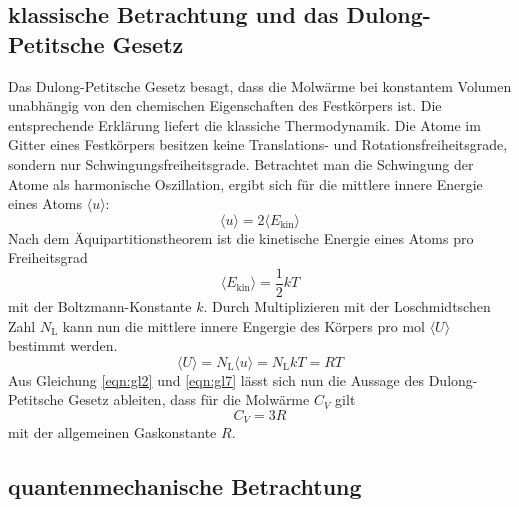 \subsection{klassische Betrachtung und das Dulong-Petitsche Gesetz}
\label{sec:klassisch}

Das Dulong-Petitsche Gesetz besagt, dass die Molwärme bei konstantem Volumen unabhängig von den chemischen Eigenschaften des Festkörpers ist.
Die entsprechende Erklärung liefert die klassiche Thermodynamik.
Die Atome im Gitter eines Festkörpers besitzen keine Translations- und Rotationsfreiheitsgrade, sondern nur Schwingungsfreiheitsgrade.
Betrachtet man die Schwingung der Atome als harmonische Oszillation, ergibt sich für die mittlere innere Energie eines Atoms $\langle u \rangle$:
\begin{equation}
  \langle u \rangle = 2 \langle E_\text{kin} \rangle
  \label{eqn:gl5}
\end{equation}
Nach dem Äquipartitionstheorem ist die kinetische Energie eines Atoms pro Freiheitsgrad
\begin{equation}
  \langle E_\text{kin} \rangle = \frac{1}{2} k T
  \label{eqn:gl6}
\end{equation}
mit der Boltzmann-Konstante $k$.
Durch Multiplizieren mit der Loschmidtschen Zahl $N_\text{L}$ kann nun die mittlere innere Engergie des Körpers pro \si{\mol} $\langle U \rangle$ bestimmt werden.
\begin{equation}
  \langle U \rangle = N_\text{L} \langle u \rangle = N_\text{L} k T = R T
  \label{eqn:gl7}
\end{equation}
Aus Gleichung \eqref{eqn:gl2} und \eqref{eqn:gl7} lässt sich nun die Aussage des Dulong-Petitsche Gesetz ableiten, dass für die Molwärme $C_V$ gilt
\begin{equation}
  C_V = 3 R
  \label{eqn:gl8}
\end{equation}
mit der allgemeinen Gaskonstante $R$.

\subsection{quantenmechanische Betrachtung}
\label{sec:quantenmechanisch}

